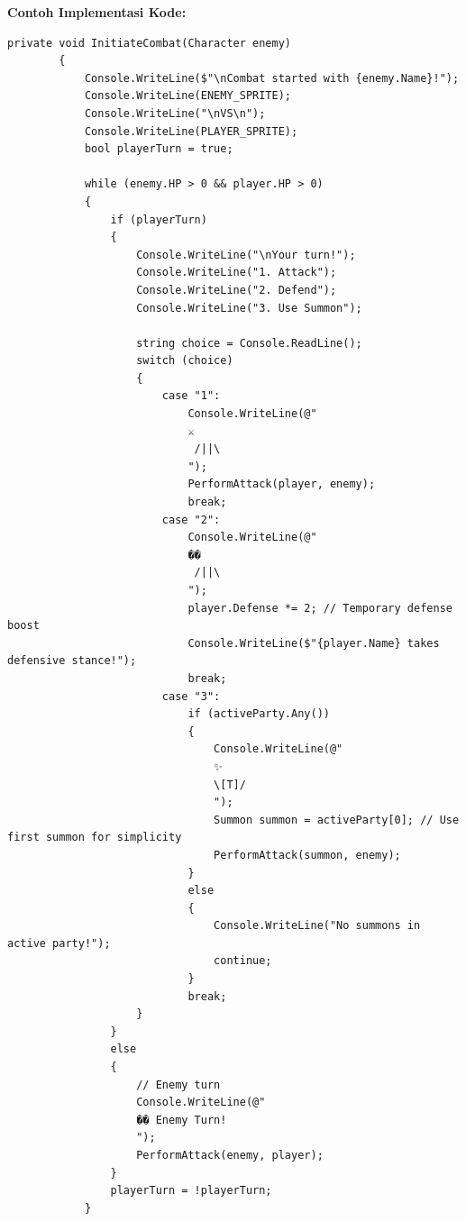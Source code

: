 \documentclass[12pt]{article}
\begin{document}
\textbf{Contoh Implementasi Kode:}
\begin{lstlisting}[language=CSharp, caption=Implementasi Combat System dengan Attack]
private void InitiateCombat(Character enemy)
        {
            Console.WriteLine($"\nCombat started with {enemy.Name}!");
            Console.WriteLine(ENEMY_SPRITE);
            Console.WriteLine("\nVS\n");
            Console.WriteLine(PLAYER_SPRITE);
            bool playerTurn = true;

            while (enemy.HP > 0 && player.HP > 0)
            {
                if (playerTurn)
                {
                    Console.WriteLine("\nYour turn!");
                    Console.WriteLine("1. Attack");
                    Console.WriteLine("2. Defend");
                    Console.WriteLine("3. Use Summon");

                    string choice = Console.ReadLine();
                    switch (choice)
                    {
                        case "1":
                            Console.WriteLine(@"
                            ⚔️
                             /||\ 
                            ");
                            PerformAttack(player, enemy);
                            break;
                        case "2":
                            Console.WriteLine(@"
                            ��️
                             /||\ 
                            ");
                            player.Defense *= 2; // Temporary defense boost
                            Console.WriteLine($"{player.Name} takes defensive stance!");
                            break;
                        case "3":
                            if (activeParty.Any())
                            {
                                Console.WriteLine(@"
                                ✨
                                \[T]/
                                ");
                                Summon summon = activeParty[0]; // Use first summon for simplicity
                                PerformAttack(summon, enemy);
                            }
                            else
                            {
                                Console.WriteLine("No summons in active party!");
                                continue;
                            }
                            break;
                    }
                }
                else
                {
                    // Enemy turn
                    Console.WriteLine(@"
                    �� Enemy Turn!
                    ");
                    PerformAttack(enemy, player);
                }
                playerTurn = !playerTurn;
            }


\end{lstlisting}
\end{document}
